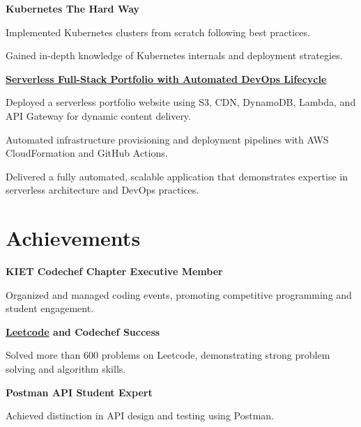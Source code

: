 \documentclass[letterpaper,10pt]{article}
\newcommand{\heading}[2]{
  \hspace{10pt}#1\hfill#2\\
}
\newcommand{\headingBf}[2]{
  \heading{\textbf{#1}}{\textbf{#2}}
}
\newenvironment{resume_list}{
  \vspace{-7pt}
  \begin{itemize}[itemsep=-2px, parsep=1pt, leftmargin=30pt]
}{
  \end{itemize}
}
\begin{document}
\headingBf{Kubernetes The Hard Way}{}
\begin{resume_list}
  \item Implemented Kubernetes clusters from scratch following best practices.
  \item Gained in-depth knowledge of Kubernetes internals and deployment strategies.
\end{resume_list}

\headingBf{\href {https://github.com/1md3nd/portfolio}{Serverless Full-Stack Portfolio with Automated DevOps Lifecycle}}{}
\begin{resume_list}
  \item Deployed a serverless portfolio website using S3, CDN, DynamoDB, Lambda, and API Gateway for dynamic content delivery.
  \item Automated infrastructure provisioning and deployment pipelines with AWS CloudFormation and GitHub Actions.
  \item Delivered a fully automated, scalable application that demonstrates expertise in serverless architecture and DevOps practices.

\end{resume_list}

\section{Achievements}
\headingBf{KIET Codechef Chapter Executive Member}{}
\begin{resume_list}
\item Organized and managed coding events, promoting competitive programming and student engagement.
\end{resume_list}

\headingBf{\href {https://www.leetcode.com/1md3nd}{Leetcode} and Codechef Success}{}
\begin{resume_list}
\item Solved more than 600 problems on Leetcode, demonstrating strong problem solving and algorithm skills.
\end{resume_list}

\headingBf{Postman API Student Expert}{}
\begin{resume_list}
\item Achieved distinction in API design and testing using Postman.
\end{resume_list}
\end{document}
